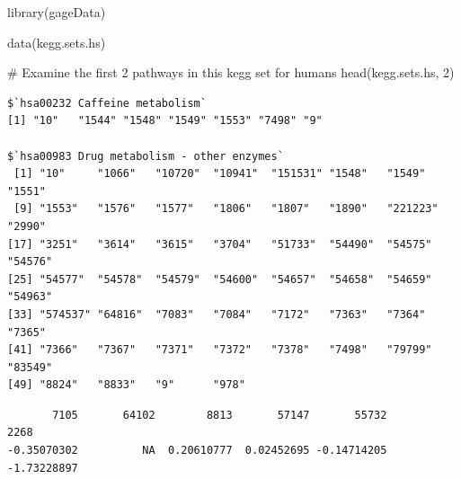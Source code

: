 \documentclass[
  letterpaper,
  DIV=11,
  numbers=noendperiod]{scrartcl}
\newenvironment{Shaded}{\begin{snugshade}}{\end{snugshade}}
\newcommand{\CommentTok}[1]{\textcolor[rgb]{0.37,0.37,0.37}{#1}}
\newcommand{\DecValTok}[1]{\textcolor[rgb]{0.68,0.00,0.00}{#1}}
\newcommand{\FunctionTok}[1]{\textcolor[rgb]{0.28,0.35,0.67}{#1}}
\newcommand{\NormalTok}[1]{\textcolor[rgb]{0.00,0.23,0.31}{#1}}
\newcommand{\OtherTok}[1]{\textcolor[rgb]{0.00,0.23,0.31}{#1}}
\newcommand{\SpecialCharTok}[1]{\textcolor[rgb]{0.37,0.37,0.37}{#1}}
\begin{document}
\begin{verbatim}
\end{verbatim}

\begin{Shaded}
\begin{Highlighting}[]
\FunctionTok{library}\NormalTok{(gageData)}
\end{Highlighting}
\end{Shaded}

\begin{Shaded}
\begin{Highlighting}[]
\FunctionTok{data}\NormalTok{(kegg.sets.hs)}

\CommentTok{\# Examine the first 2 pathways in this kegg set for humans}
\FunctionTok{head}\NormalTok{(kegg.sets.hs, }\DecValTok{2}\NormalTok{)}
\end{Highlighting}
\end{Shaded}

\begin{verbatim}
$`hsa00232 Caffeine metabolism`
[1] "10"   "1544" "1548" "1549" "1553" "7498" "9"   

$`hsa00983 Drug metabolism - other enzymes`
 [1] "10"     "1066"   "10720"  "10941"  "151531" "1548"   "1549"   "1551"  
 [9] "1553"   "1576"   "1577"   "1806"   "1807"   "1890"   "221223" "2990"  
[17] "3251"   "3614"   "3615"   "3704"   "51733"  "54490"  "54575"  "54576" 
[25] "54577"  "54578"  "54579"  "54600"  "54657"  "54658"  "54659"  "54963" 
[33] "574537" "64816"  "7083"   "7084"   "7172"   "7363"   "7364"   "7365"  
[41] "7366"   "7367"   "7371"   "7372"   "7378"   "7498"   "79799"  "83549" 
[49] "8824"   "8833"   "9"      "978"   
\end{verbatim}

\begin{Shaded}
\end{Shaded}

\begin{verbatim}
       7105       64102        8813       57147       55732        2268 
-0.35070302          NA  0.20610777  0.02452695 -0.14714205 -1.73228897 
\end{verbatim}
\end{document}
